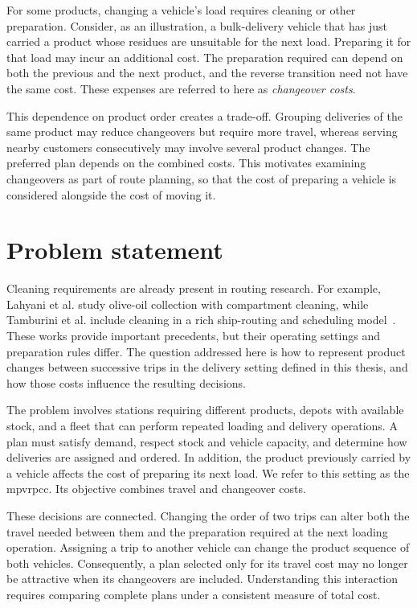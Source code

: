 For some products, changing a vehicle's load requires cleaning or other
preparation. Consider, as an illustration, a bulk-delivery vehicle that has
just carried a product whose residues are unsuitable for the next load.
Preparing it for that load may incur an additional cost. The preparation
required can depend on both the previous and the next product, and the
reverse transition need not have the same cost. These expenses are referred
to here as \emph{changeover costs}.

This dependence on product order creates a trade-off. Grouping deliveries
of the same product may reduce changeovers but require more travel, whereas
serving nearby customers consecutively may involve several product changes.
The preferred plan depends on the combined costs. This motivates examining
changeovers as part of route planning, so that the cost of preparing a
vehicle is considered alongside the cost of moving it.

\section*{Problem statement}

Cleaning requirements are already present in routing research. For example,
Lahyani et al. study olive-oil collection with compartment cleaning, while
Tamburini et al. include cleaning in a rich ship-routing and scheduling
model~\cite{lahyani2015oilmulticompartment,TAMBURINI2025104019}. These works
provide important precedents, but their operating settings and preparation
rules differ. The question addressed here is how to represent product
changes between successive trips in the delivery setting defined in this
thesis, and how those costs influence the resulting decisions.

The problem involves stations requiring different products, depots with
available stock, and a fleet that can perform repeated loading and delivery
operations. A plan must satisfy demand, respect stock and vehicle capacity,
and determine how deliveries are assigned and ordered. In addition, the
product previously carried by a vehicle affects the cost of preparing its
next load. We refer to this setting as the \gls{mpvrpcc}. Its objective
combines travel and changeover costs.

These decisions are connected. Changing the order of two trips can alter
both the travel needed between them and the preparation required at the next
loading operation. Assigning a trip to another vehicle can change the
product sequence of both vehicles. Consequently, a plan selected only for
its travel cost may no longer be attractive when its changeovers are
included. Understanding this interaction requires comparing complete plans
under a consistent measure of total cost.

